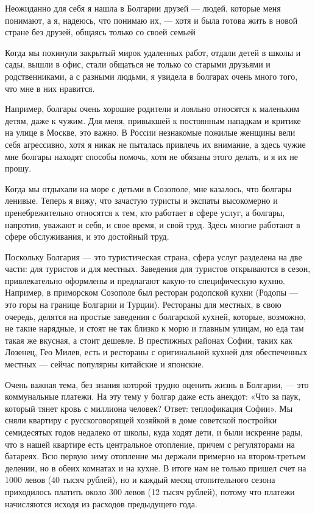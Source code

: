 \begin{fancyquotes}
    Неожиданно для себя я нашла в Болгарии друзей — людей, которые меня понимают, а я, надеюсь, что понимаю их, — хотя и была готова жить в новой стране без друзей, общаясь только со своей семьей
\end{fancyquotes}

Когда мы покинули закрытый мирок удаленных работ, отдали детей в школы и сады, вышли в офис, стали общаться не только со старыми друзьями и родственниками, а с разными людьми, я увидела в болгарах очень много того, что мне в них нравится.

Например, болгары очень хорошие родители и лояльно относятся к маленьким детям, даже к чужим. Для меня, привыкшей к постоянным нападкам и критике на улице в Москве, это важно. В России незнакомые пожилые женщины вели себя агрессивно, хотя я никак не пыталась привлечь их внимание, а здесь чужие мне болгары находят способы помочь, хотя не обязаны этого делать, и я их не прошу.

Когда мы отдыхали на море с детьми в Созополе, мне казалось, что болгары ленивые. Теперь я вижу, что зачастую туристы и экспаты высокомерно и пренебрежительно относятся к тем, кто работает в сфере услуг, а болгары, напротив, уважают и себя, и свое время, и свой труд. Здесь многие работают в сфере обслуживания, и это достойный труд.

Поскольку Болгария — это туристическая страна, сфера услуг разделена на две части: для туристов и для местных. Заведения для туристов открываются в сезон, привлекательно оформлены и предлагают какую-то специфическую кухню. Например, в приморском Созополе был ресторан родопской кухни (Родопы — это горы на границе Болгарии и Турции). Рестораны для местных, в свою очередь, делятся на простые заведения с болгарской кухней, которые, возможно, не такие нарядные, и стоят не так близко к морю и главным улицам, но еда там такая же вкусная, а стоит дешевле. В престижных районах Софии, таких как Лозенец, Гео Милев, есть и рестораны с оригинальной кухней для обеспеченных местных — сейчас популярны китайские и японские.

Очень важная тема, без знания которой трудно оценить жизнь в Болгарии, — это коммунальные платежи. На эту тему у болгар даже есть анекдот: «Что за паук, который тянет кровь с миллиона человек? Ответ: теплофикация Софии». Мы сняли квартиру с русскоговорящей хозяйкой в доме советской постройки семидесятых годов недалеко от школы, куда ходят дети, и были искренне рады, что в нашей квартире есть центральное отопление, причем с регуляторами на батареях. Всю первую зиму отопление мы держали примерно на втором-третьем делении, но в обеих комнатах и на кухне. В итоге нам не только пришел счет на 1000 левов (40 тысяч рублей), но и каждый месяц отопительного сезона приходилось платить около 300 левов (12 тысяч рублей), потому что платежи начисляются исходя из расходов предыдущего года.


